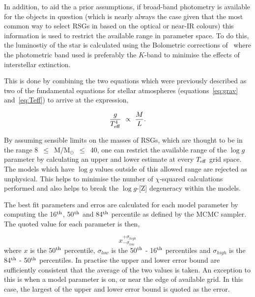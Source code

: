 In addition, to aid the a prior assumptions, if broad-band photometry is available for the objects in question (which is nearly always the case given that the most common way to select RSGs in based on the optical or near-IR colours) this information is used to restrict the available range in parameter space.
To do this, the luminostiy of the star is calculated using the Bolometric corrections of~\citet{2013ApJ...767....3D} where the photometric band used is preferably the $K$-band to minimise the effects of interstellar extinction.

This is done by combining the two equations which were previously described as two of the fundamental equations for stellar atmospheres (equations~\ref{eq:grav} and~\ref{eq:Teff}) to arrive at the expression,

\begin{equation}
    \frac{g}{T^{4}_{\rm eff}}~\propto~\frac{M}{L}.
\end{equation}

By assuming sensible limits on the masses of RSGs, which are thought to be in the range 8~$\leq$~M/M$_{\odot}$~$\leq$~40, one can restrict the available range of the $\log g$ parameter by calculating an upper and lower estimate at every $T_{\rm eff}$ grid space.
The models which have $\log g$ values outside of this allowed range are rejected as unphysical.
This helps to minimise the number of $\chi$-squared calculations performed and also helps to break the $\log g$-[Z] degeneracy within the models.

The best fit parameters and erros are calculated for each model parameter by computing the 16$^{\rm th}$, 50$^{\rm th}$ and 84$^{\rm th}$ percentile as defined by the MCMC sampler.
The quoted value for each parameter is then,

\begin{equation}
     x_{-\sigma_{low}}^{+\sigma_{high}}
\end{equation}
\noindent where $x$ is the 50$^{\rm th}$ percentile, $\sigma_{low}$ is the 50$^{\rm th}$ - 16$^{\rm th}$ percentiles and $\sigma_{high}$ is the 84$^{\rm th}$ - 50$^{\rm th}$ percentiles.
In practise the upper and lower error bound are sufficiently consistent that the average of the two values is taken.
An exception to this is when a model parameter is on, or near the edge of available grid.
In this case, the largest of the upper and lower error bound is quoted as the error.




